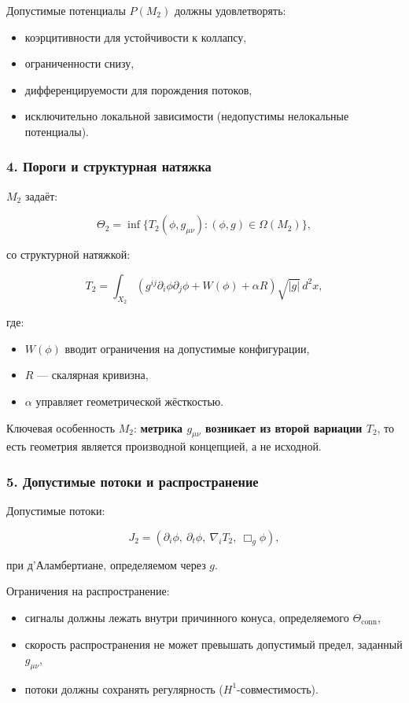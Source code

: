 Допустимые потенциалы $P(M_2)$ должны удовлетворять:

\begin{itemize}
    \item коэрцитивности для устойчивости к коллапсу,
    \item ограниченности снизу,
    \item дифференцируемости для порождения потоков,
    \item исключительно локальной зависимости (недопустимы нелокальные потенциалы).
\end{itemize}

\subsubsection*{4. Пороги и структурная натяжка}

$M_2$ задаёт:

\[
\Theta_2 = \inf \{ T_2(\phi, g_{\mu\nu}) : (\phi, g) \in \Omega(M_2) \},
\]

со структурной натяжкой:

\[
T_2 = \int_{X_2}
\left(
g^{ij} \partial_i \phi \partial_j \phi
+ W(\phi)
+ \alpha R
\right)
\sqrt{|g|}\, d^2x,
\]

где:

\begin{itemize}
    \item $W(\phi)$ вводит ограничения на допустимые конфигурации,
    \item $R$ — скалярная кривизна,
    \item $\alpha$ управляет геометрической жёсткостью.
\end{itemize}

Ключевая особенность $M_2$:
\textbf{метрика $g_{\mu\nu}$ возникает из второй вариации $T_2$},
то есть геометрия является производной концепцией, а не исходной.

\subsubsection*{5. Допустимые потоки и распространение}

Допустимые потоки:

\[
J_2 = (\partial_i \phi,\ \partial_t \phi,\ \nabla_i T_2,\ \Box_g \phi),
\]

при д'Аламбертиане, определяемом через $g$.

Ограничения на распространение:

\begin{itemize}
    \item сигналы должны лежать внутри причинного конуса,
    определяемого $\Theta_{\text{conn}}$,
    \item скорость распространения не может превышать допустимый предел,
    заданный $g_{\mu\nu}$,
    \item потоки должны сохранять регулярность ($H^1$-совместимость).
\end{itemize}

